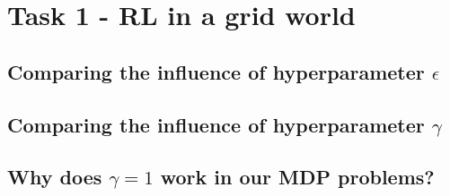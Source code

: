 
\section{Task 1 - RL in a grid world}


\subsection{Comparing the influence of hyperparameter $\epsilon$}


\subsection{Comparing the influence of hyperparameter $\gamma$}

\subsection{Why does $\gamma=1$ work in our MDP problems?}
